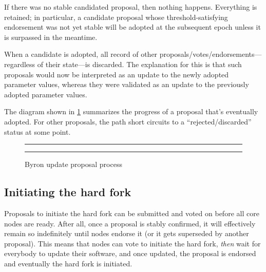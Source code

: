 \begin{enumerate}
If there was no stable candidated proposal, then nothing happens. Everything is
retained; in particular, a candidate proposal whose threshold-satisfying
endorsement was not yet stable will be adopted at the subsequent epoch unless it
is surpassed in the meantime.

When a candidate is adopted, all record of other
proposals/votes/endorsements---regardless of their state---is discarded. The
explanation for this is that such proposals would now be interpreted as an
update to the newly adopted parameter values, whereas they were validated as an
update to the previously adopted parameter values.

\end{enumerate}

The diagram shown in \cref{byron:update-process} summarizes the progress of a
proposal that's eventually adopted. For other proposals, the path short circuits
to a ``rejected/discarded'' status at some point.

\begin{figure}
\hrule
\begin{center}
\end{center}
\hrule
\caption{\label{byron:update-process}Byron update proposal process}
\end{figure}

\subsection{Initiating the hard fork}
\label{byron:hardfork:initiating}

Proposals to initiate the hard fork can be submitted and voted on before all
core nodes are ready. After all, once a proposal is stably confirmed, it will
effectively remain so indefinitely until nodes endorse it (or it gets superseded
by another proposal). This means that nodes can vote to initiate the hard fork,
\emph{then} wait for everybody to update their software, and once updated, the
proposal is endorsed and eventually the hard fork is initiated.

